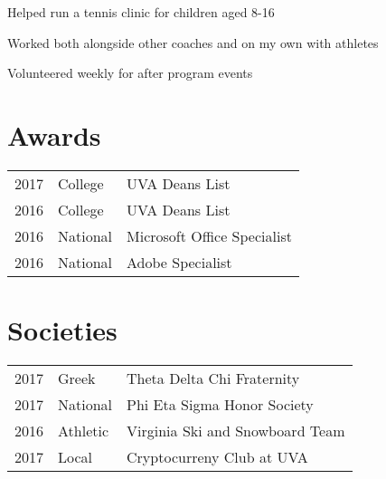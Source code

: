 \documentclass[]{deedy-resume-openfont}
\begin{document}
\begin{minipage}[t]{0.66\textwidth}
\begin{tightemize}
\item 	Helped run a tennis clinic for children aged 8-16 \item Worked both alongside other coaches and on my own with athletes \item Volunteered weekly for after program events  \end{tightemize}
\sectionsep




\section{Awards} 
\begin{tabular}{rll}
2017 & College & UVA Deans List \\
2016 & College & UVA Deans List \\
2016 & National & Microsoft Office Specialist \\
2016 & National & Adobe Specialist \\

\end{tabular}
\sectionsep


\section{Societies} 

\begin{tabular}{rll}
2017 	& Greek    & Theta Delta Chi Fraternity\\
2017   & National   & Phi Eta Sigma Honor Society\\
2016  & Athletic    & Virginia Ski and Snowboard Team \\
2017   & Local  &    Cryptocurreny Club at UVA
\end{tabular}
\sectionsep

\end{minipage} 
\end{document}
